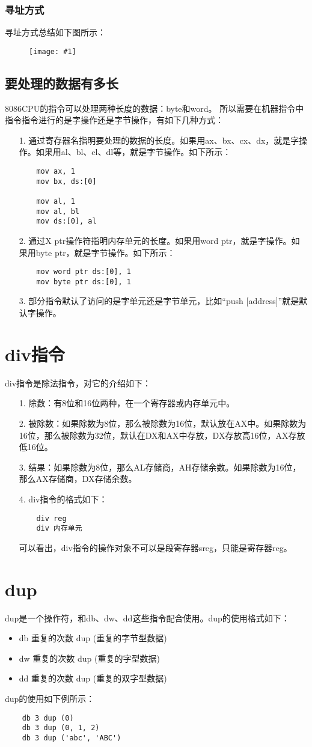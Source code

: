 \documentclass[a4paper,left=2.5cm,right=2.5cm,11pt]{article}
\newcommand{\fic}[1]{\begin{figure}[H]
		\center
		\texttt{[image: \#1]}
	\end{figure}}
\begin{document}
\subsubsection{寻址方式}
	寻址方式总结如下图所示：
	\fic{1.png}

\subsection{要处理的数据有多长}
	8086CPU的指令可以处理两种长度的数据：byte和word。
	所以需要在机器指令中指令指令进行的是字操作还是字节操作，有如下几种方式：
	\begin{itemize}
		\item[1.] 通过寄存器名指明要处理的数据的长度。如果用ax、bx、cx、dx，就是字操作。如果用al、bl、cl、dl等，就是字节操作。如下所示：
		\begin{lstlisting}
	mov ax, 1
	mov bx, ds:[0]

	mov al, 1
	mov al, bl
	mov ds:[0], al
		\end{lstlisting}

		\item[2.] 通过X ptr操作符指明内存单元的长度。如果用word ptr，就是字操作。如果用byte ptr，就是字节操作。如下所示：
		\begin{lstlisting}
	mov word ptr ds:[0], 1
	mov byte ptr ds:[0], 1
		\end{lstlisting}

		\item[3.] 部分指令默认了访问的是字单元还是字节单元，比如“push [address]”就是默认字操作。
	\end{itemize}

\section{div指令}
	div指令是除法指令，对它的介绍如下：
	\begin{itemize}
		\item[1.] 除数：有8位和16位两种，在一个寄存器或内存单元中。
		\item[2.] 被除数：如果除数为8位，那么被除数为16位，默认放在AX中。如果除数为16位，那么被除数为32位，默认在DX和AX中存放，DX存放高16位，AX存放低16位。
		\item[3.] 结果：如果除数为8位，那么AL存储商，AH存储余数。如果除数为16位，那么AX存储商，DX存储余数。
		\item[4.] div指令的格式如下：
		\begin{lstlisting}
	div reg
	div 内存单元
		\end{lstlisting}

		可以看出，div指令的操作对象不可以是段寄存器sreg，只能是寄存器reg。
	\end{itemize}

\section{dup}
	dup是一个操作符，和db、dw、dd这些指令配合使用。dup的使用格式如下：
	\begin{itemize}
		\item db 重复的次数 dup (重复的字节型数据)
		\item dw 重复的次数 dup (重复的字型数据)
		\item dd 重复的次数 dup (重复的双字型数据)
	\end{itemize}

	dup的使用如下例所示：
	\begin{lstlisting}
	db 3 dup (0)
	db 3 dup (0, 1, 2)
	db 3 dup ('abc', 'ABC')
	\end{lstlisting}
\end{document}
